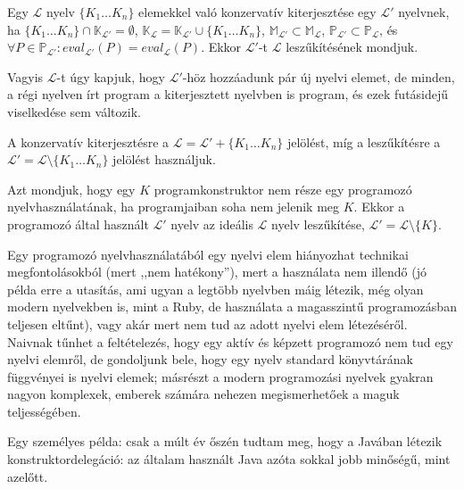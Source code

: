 \begin{defn}
	Egy $\mathcal{L}$ nyelv $\{K_1 \ldots K_n\}$ elemekkel való konzervatív kiterjesztése egy $\mathcal{L}'$ nyelvnek, ha
	$ \{K_1 \ldots K_n\} \cap \mathbb{K}_{\mathcal{L}'} = \emptyset$,
	$\mathbb{K}_\mathcal{L} = \mathbb{K}_{\mathcal{L}'} \cup \{K_1 \ldots K_n\}$,
	$\mathbb{M}_{\mathcal{L}'} \subset \mathbb{M}_\mathcal{L}$, $\mathbb{P}_{\mathcal{L}'} \subset \mathbb{P}_\mathcal{L}$, és $ \forall P \in \mathbb{P}_{\mathcal{L}'}: eval_{\mathcal{L}'}(P) = eval_\mathcal{L}(P)$. Ekkor $\mathcal{L}'$-t $\mathcal{L}$ leszűkítésének mondjuk.

	\normalfont Vagyis $\mathcal{L}$-t úgy kapjuk, hogy $\mathcal{L}'$-höz hozzáadunk pár új nyelvi elemet, de minden, a régi nyelven írt program a kiterjesztett nyelvben is program, és ezek futásidejű viselkedése sem változik.

	\normalfont A konzervatív kiterjesztésre a $\mathcal{L} = \mathcal{L}' + \{K_1 \ldots K_n\}$ jelölést, míg a leszűkítésre a $\mathcal{L}' = \mathcal{L} \setminus \{K_1 \ldots K_n\}$ jelölést használjuk.
\end{defn}


\begin{defn}[Nyelvhasználat]
Azt mondjuk, hogy egy $K$ programkonstruktor nem része egy programozó nyelvhasználatának, ha programjaiban soha nem jelenik meg $K$.
Ekkor a programozó által használt $\mathcal{L}'$ nyelv az ideális $\mathcal{L}$ nyelv leszűkítése, $\mathcal{L}' = \mathcal{L} \setminus \{K\}$.

\normalfont Egy programozó nyelvhasználatából egy nyelvi elem hiányozhat technikai megfontolásokból (mert ,,nem hatékony''), mert a használata nem illendő (jó példa erre a  utasítás, ami ugyan a legtöbb nyelvben máig létezik, még olyan modern nyelvekben is, mint a Ruby, de használata a magasszintű programozásban teljesen eltűnt), vagy akár mert nem tud az adott nyelvi elem létezéséről.
Naivnak tűnhet a feltételezés, hogy egy aktív és képzett programozó nem tud egy nyelvi elemről, de gondoljunk bele, hogy egy nyelv standard könyvtárának függvényei is nyelvi elemek; másrészt a modern programozási nyelvek gyakran nagyon komplexek, emberek számára nehezen megismerhetőek a maguk teljességében.

Egy személyes példa: csak a múlt év őszén tudtam meg, hogy a Javában létezik konstruktordelegáció: az általam használt Java azóta sokkal jobb minőségű, mint azelőtt.
\end{defn}



